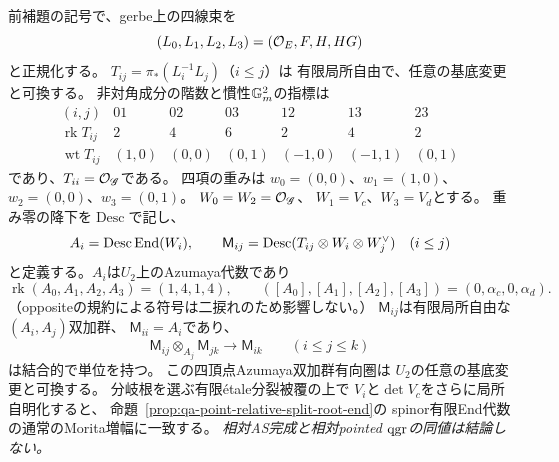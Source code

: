 \begin{theorem}[四頂点のAzumaya双加群による有限Morita表示]
\label{thm:qa-twisted-four-vertex-morita}
前補題の記号で、gerbe上の四線束を
\begin{equation}
 (L_0,L_1,L_2,L_3)=(\mathcal O_E,F,H,HG)
 \label{eq:qa-morita-normalized-four}
\end{equation}
と正規化する。
$T_{ij}=\pi_*(L_i^{-1}L_j)$（$i\le j$）は
有限局所自由で、任意の基底変更と可換する。
非対角成分の階数と慣性$\mathbb G_m^2$の指標は
\begin{equation}
\begin{array}{c|rrrrrr}
(i,j)&01&02&03&12&13&23\\\hline
\operatorname{rk}T_{ij}&2&4&6&2&4&2\\
\operatorname{wt}T_{ij}&(1,0)&(0,0)&(0,1)&(-1,0)&(-1,1)&(0,1)
\end{array}
\label{eq:qa-morita-hom-weights}
\end{equation}
であり、$T_{ii}=\mathcal O_{\mathscr G}$である。
四項の重みは
$w_0=(0,0)$、$w_1=(1,0)$、$w_2=(0,0)$、$w_3=(0,1)$。
$W_0=W_2=\mathcal O_{\mathscr G}$、
$W_1=V_c$、$W_3=V_d$とする。
重み零の降下を$\operatorname{Desc}$で記し、
\[
 A_i=\operatorname{Desc}\operatorname{End}(W_i),\qquad
 {\mathsf M}_{ij}
 =\operatorname{Desc}(T_{ij}\otimes W_i\otimes W_j^\vee)
 \quad(i\le j)
\]
と定義する。$A_i$は$U_2$上のAzumaya代数であり
\begin{equation}
 \operatorname{rk}(A_0,A_1,A_2,A_3)=(1,4,1,4),\qquad
 ([A_0],[A_1],[A_2],[A_3])=(0,\alpha_c,0,\alpha_d).
 \label{eq:qa-morita-vertex-classes}
\end{equation}
（oppositeの規約による符号は二捩れのため影響しない。）
$\mathsf M_{ij}$は有限局所自由な$(A_i,A_j)$双加群、
$\mathsf M_{ii}=A_i$であり、
\begin{equation}
 {\mathsf M}_{ij}\otimes_{A_j}{\mathsf M}_{jk}
 \longrightarrow{\mathsf M}_{ik}
 \qquad(i\le j\le k)
 \label{eq:qa-morita-bimodule-product}
\end{equation}
は結合的で単位を持つ。
この四頂点Azumaya双加群有向圏は
$U_2$の任意の基底変更と可換する。
分岐根を選ぶ有限étale分裂被覆の上で
$V_i$と$\det V_c$をさらに局所自明化すると、
命題~\ref{prop:qa-point-relative-split-root-end}の
spinor有限End代数の通常のMorita増幅に一致する。
\emph{相対AS完成と相対pointed $\operatorname{qgr}$の同値は結論しない。}
\end{theorem}
